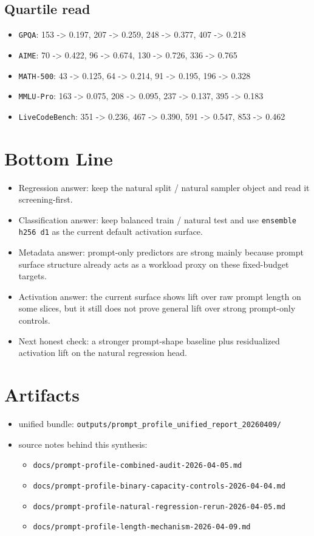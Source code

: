 \documentclass[11pt]{article}
\begin{document}
\subsection*{Quartile read}
\begin{itemize}[leftmargin=1.5em]
\item \texttt{GPQA}: 153 -> 0.197, 207 -> 0.259, 248 -> 0.377, 407 -> 0.218
\item \texttt{AIME}: 70 -> 0.422, 96 -> 0.674, 130 -> 0.726, 336 -> 0.765
\item \texttt{MATH-500}: 43 -> 0.125, 64 -> 0.214, 91 -> 0.195, 196 -> 0.328
\item \texttt{MMLU-Pro}: 163 -> 0.075, 208 -> 0.095, 237 -> 0.137, 395 -> 0.183
\item \texttt{LiveCodeBench}: 351 -> 0.236, 467 -> 0.390, 591 -> 0.547, 853 -> 0.462
\end{itemize}

\section*{Bottom Line}
\begin{itemize}[leftmargin=1.5em]
\item Regression answer: keep the natural split / natural sampler object and read it screening-first.
\item Classification answer: keep balanced train / natural test and use \texttt{ensemble h256 d1} as the current default activation surface.
\item Metadata answer: prompt-only predictors are strong mainly because prompt surface structure already acts as a workload proxy on these fixed-budget targets.
\item Activation answer: the current surface shows lift over raw prompt length on some slices, but it still does not prove general lift over strong prompt-only controls.
\item Next honest check: a stronger prompt-shape baseline plus residualized activation lift on the natural regression head.
\end{itemize}

\section*{Artifacts}
\begin{itemize}[leftmargin=1.5em]
\item unified bundle: \texttt{outputs/prompt\_profile\_unified\_report\_20260409/}
\item source notes behind this synthesis:
  \begin{itemize}[leftmargin=1.5em]
  \item \texttt{docs/prompt-profile-combined-audit-2026-04-05.md}
  \item \texttt{docs/prompt-profile-binary-capacity-controls-2026-04-04.md}
  \item \texttt{docs/prompt-profile-natural-regression-rerun-2026-04-05.md}
  \item \texttt{docs/prompt-profile-length-mechanism-2026-04-09.md}
  \end{itemize}
\end{itemize}
\end{document}
